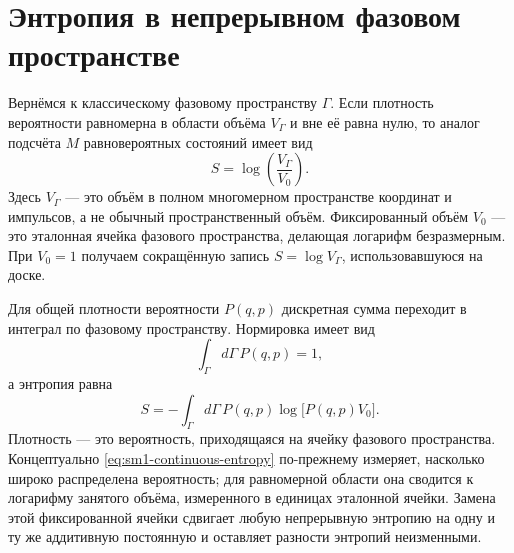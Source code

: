 \begin{classroomqa}
\end{classroomqa}

\section{Энтропия в непрерывном фазовом пространстве}

Вернёмся к классическому фазовому пространству \(\Gamma\). Если плотность вероятности равномерна в области объёма \(V_\Gamma\) и вне её равна нулю, то аналог подсчёта \(M\) равновероятных состояний имеет вид
\begin{equation}
 S=\log\!\left(\frac{V_\Gamma}{V_0}\right).
 \label{eq:sm1-continuous-uniform}
\end{equation}
Здесь \(V_\Gamma\) — это объём в полном многомерном пространстве координат и импульсов, а не обычный пространственный объём. Фиксированный объём \(V_0\) — это эталонная ячейка фазового пространства, делающая логарифм безразмерным. При \(V_0=1\) получаем сокращённую запись \(S=\log V_\Gamma\), использовавшуюся на доске.

Для общей плотности вероятности \(P(q,p)\) дискретная сумма переходит в интеграл по фазовому пространству. Нормировка имеет вид
\begin{equation}
 \int_\Gamma d\Gamma\,P(q,p)=1,
 \label{eq:sm1-continuous-normalization}
\end{equation}
а энтропия равна
\begin{equation}
 S=-\int_\Gamma d\Gamma\,
 P(q,p)\log\!\bigl[P(q,p)V_0\bigr].
 \label{eq:sm1-continuous-entropy}
\end{equation}
Плотность — это вероятность, приходящаяся на ячейку фазового пространства. Концептуально \eqref{eq:sm1-continuous-entropy} по-прежнему измеряет, насколько широко распределена вероятность; для равномерной области она сводится к логарифму занятого объёма, измеренного в единицах эталонной ячейки. Замена этой фиксированной ячейки сдвигает любую непрерывную энтропию на одну и ту же аддитивную постоянную и оставляет разности энтропий неизменными.

